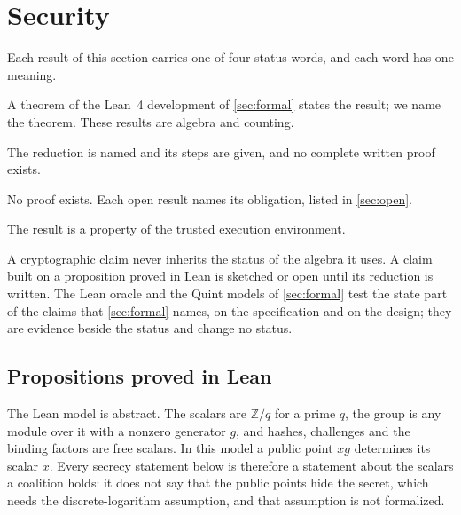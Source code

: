 \section{Security}\label{sec:security}

Each result of this section carries one of four status words, and each word has one meaning.
\begin{description}[leftmargin=1.5em,itemsep=1pt]
\item[Proved in Lean.] A theorem of the Lean~4 development of \cref{sec:formal} states the result; we name the theorem. These results are algebra and counting.
\item[Sketched.] The reduction is named and its steps are given, and no complete written proof exists.
\item[Open.] No proof exists. Each open result names its obligation, listed in \cref{sec:open}.
\item[Assumed.] The result is a property of the trusted execution environment.
\end{description}
A cryptographic claim never inherits the status of the algebra it uses. A claim built on a proposition proved in Lean is sketched or open until its reduction is written. The Lean oracle and the Quint models of \cref{sec:formal} test the state part of the claims that \cref{sec:formal} names, on the specification and on the design; they are evidence beside the status and change no status.

\subsection{Propositions proved in Lean}\label{sec:lean-props}

The Lean model is abstract. The scalars are $\mathbb{Z}/q$ for a prime $q$, the group is any module over it with a nonzero generator $g$, and hashes, challenges and the binding factors are free scalars. In this model a public point $x g$ determines its scalar $x$. Every secrecy statement below is therefore a statement about the scalars a coalition holds: it does not say that the public points hide the secret, which needs the discrete-logarithm assumption, and that assumption is not formalized.

